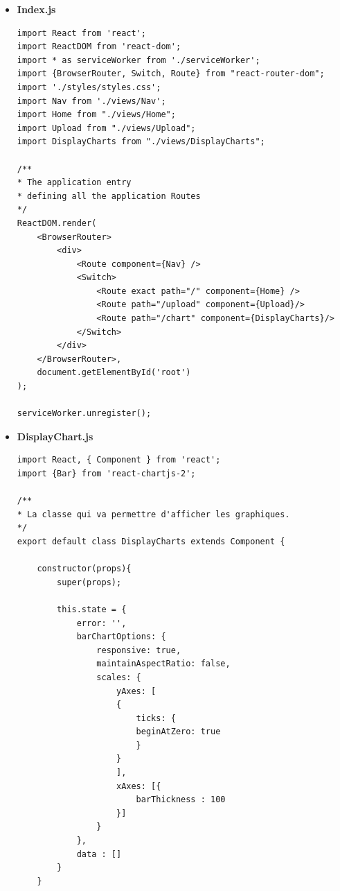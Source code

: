 \documentclass[a4paper,11pt]{article}
\begin{document}
\begin{itemize}
\begin{itemize}
\begin{verbatim}
}
\end{verbatim}
\item \textbf{Index.js}
\begin{verbatim}
import React from 'react';
import ReactDOM from 'react-dom';
import * as serviceWorker from './serviceWorker';
import {BrowserRouter, Switch, Route} from "react-router-dom";
import './styles/styles.css';
import Nav from './views/Nav';
import Home from "./views/Home";
import Upload from "./views/Upload";
import DisplayCharts from "./views/DisplayCharts";

/**
* The application entry
* defining all the application Routes
*/
ReactDOM.render(
    <BrowserRouter>
        <div>
            <Route component={Nav} />
            <Switch>
                <Route exact path="/" component={Home} />
                <Route path="/upload" component={Upload}/>
                <Route path="/chart" component={DisplayCharts}/>
            </Switch>
        </div>
    </BrowserRouter>,
    document.getElementById('root')
);

serviceWorker.unregister();

\end{verbatim}

\item \textbf{DisplayChart.js}
\begin{verbatim}
import React, { Component } from 'react';
import {Bar} from 'react-chartjs-2';

/**
* La classe qui va permettre d'afficher les graphiques.
*/
export default class DisplayCharts extends Component {

    constructor(props){
        super(props);

        this.state = {
            error: '',
            barChartOptions: {
                responsive: true,
                maintainAspectRatio: false,
                scales: {
                    yAxes: [
                    {
                        ticks: {
                        beginAtZero: true
                        }
                    }
                    ],
                    xAxes: [{
                        barThickness : 100
                    }]
                }
            },
            data : []
        }
    }


\end{verbatim}
\end{itemize}
\end{itemize}
\end{document}
